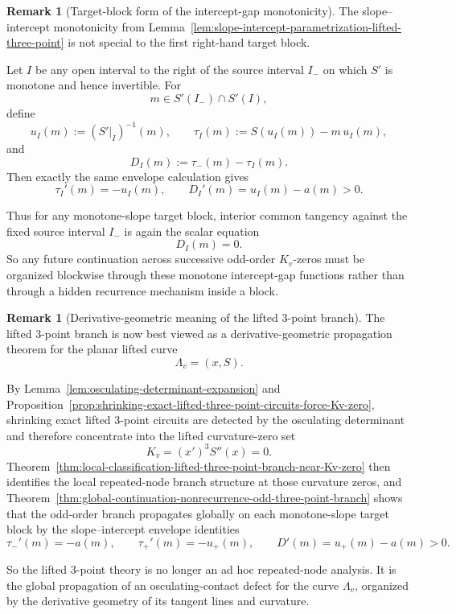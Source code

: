 \documentclass[11pt,a4paper]{amsart}
\theoremstyle{plain}
\theoremstyle{definition}
\newtheorem{remark}[theorem]{Remark}
\begin{document}
\begin{remark}[Target-block form of the intercept-gap monotonicity]
\label{rem:target-block-intercept-gap-monotonicity}
The slope--intercept monotonicity from
Lemma~\ref{lem:slope-intercept-parametrization-lifted-three-point}
is not special to the first right-hand target block.

Let $I$ be any open interval to the right of the source interval $I_-$
on which $S'$ is monotone and hence invertible. For
\[
m\in S'(I_-)\cap S'(I),
\]
define
\[
u_I(m):=(S'|_I)^{-1}(m),
\qquad
\tau_I(m):=S(u_I(m))-m\,u_I(m),
\]
and
\[
D_I(m):=\tau_-(m)-\tau_I(m).
\]
Then exactly the same envelope calculation gives
\[
\tau_I'(m)=-u_I(m),
\qquad
D_I'(m)=u_I(m)-a(m)>0.
\]

Thus for any monotone-slope target block, interior common tangency against the
fixed source interval $I_-$ is again the scalar equation
\[
D_I(m)=0.
\]
So any future continuation across successive odd-order $K_v$-zeros must be
organized blockwise through these monotone intercept-gap functions rather than
through a hidden recurrence mechanism inside a block.
\end{remark}

\begin{remark}[Derivative-geometric meaning of the lifted $3$-point branch]
\label{rem:derivative-geometry-meaning-global-three-point-branch}
The lifted $3$-point branch is now best viewed as a derivative-geometric
propagation theorem for the planar lifted curve
\[
\Lambda_v=(x,S).
\]

By Lemma~\ref{lem:osculating-determinant-expansion} and
Proposition~\ref{prop:shrinking-exact-lifted-three-point-circuits-force-Kv-zero},
shrinking exact lifted $3$-point circuits are detected by the osculating
determinant and therefore concentrate into the lifted curvature-zero set
\[
K_v=(x')^3S''(x)=0.
\]
Theorem~\ref{thm:local-classification-lifted-three-point-branch-near-Kv-zero}
then identifies the local repeated-node branch structure at those curvature
zeros, and
Theorem~\ref{thm:global-continuation-nonrecurrence-odd-three-point-branch}
shows that the odd-order branch propagates globally on each monotone-slope
target block by the slope--intercept envelope identities
\[
\tau_-'(m)=-a(m),
\qquad
\tau_+'(m)=-u_+(m),
\qquad
D'(m)=u_+(m)-a(m)>0.
\]

So the lifted $3$-point theory is no longer an ad hoc repeated-node analysis.
It is the global propagation of an osculating-contact defect for the curve
$\Lambda_v$, organized by the derivative geometry of its tangent lines and
curvature.
\end{remark}
\end{document}
